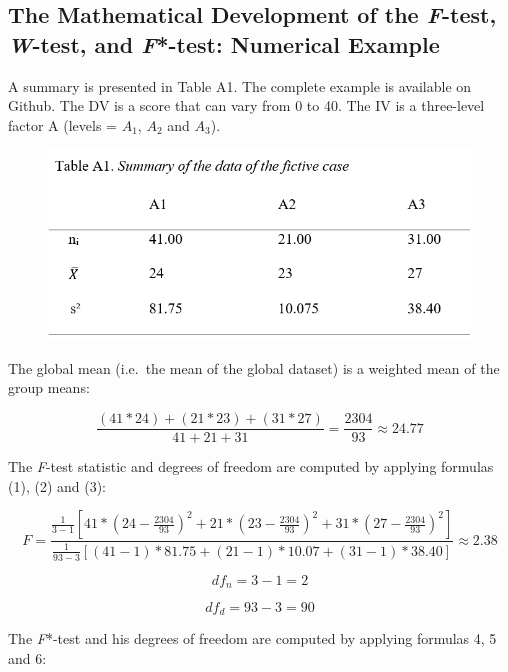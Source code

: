 \documentclass[man,floatsintext]{apa6}
\begin{document}
\begin{appendix}
\section{}
\subsection{\texorpdfstring{The Mathematical Development of the
\emph{F}-test, \emph{W}-test, and \emph{F}*-test: Numerical
Example}{The Mathematical Development of the F-test, W-test, and F*-test: Numerical Example}}\label{the-mathematical-development-of-the-f-test-w-test-and-f-test-numerical-example}

A summary is presented in Table A1. The complete example is available on
Github. The DV is a score that can vary from 0 to 40. The IV is a
three-level factor A (levels = \(A_1\), \(A_2\) and \(A_3\)).

\begin{figure}
\includegraphics[width=1\linewidth]{Rmarkdown folder/Rmarkdown inputs/TableA1} \end{figure}

The global mean (i.e.~the mean of the global dataset) is a weighted mean
of the group means:

\[\frac{(41*24)+(21*23)+(31*27)}{41+21+31}=\frac{2304}{93} \approx 24.77\]

The \emph{F}-test statistic and degrees of freedom are computed by
applying formulas (1), (2) and (3):

\[
F=\frac{\frac{1}{3-1}[41*(24-\frac{2304}{93})^2+21*(23-\frac{2304}{93})^2+31*(27-\frac{2304}{93})^2]}
{\frac{1}{93-3}[(41-1)*81.75+(21-1)*10.07+(31-1)*38.40]} \approx 2.38
\]

\[
df_n=3-1=2
\]

\[
df_d=93-3=90
\]

The \emph{F}*-test and his degrees of freedom are computed by applying
formulas 4, 5 and 6:


\end{appendix}
\end{document}

